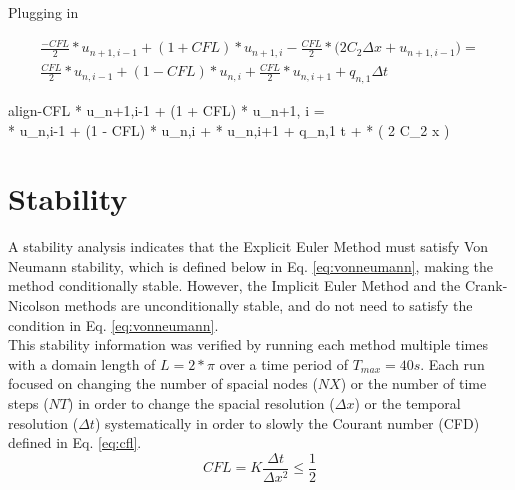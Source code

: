 \documentclass[10pt, letter, showtrims]{extarticle}
\newcommand{\boxedeq}[2]{\begin{empheq}[box={\fboxsep=6pt\fbox}]{align}\label{#1}#2\end{empheq}}
\begin{document}
    		\noindent
    		Plugging in
    		
    		\begin{equation}
    			\begin{split}
    			\frac{-CFL}{2} * u_{n+1,i-1} + (1 + CFL) * u_{n+1, i} - \frac{CFL}{2} * \big( 2 C_{2} \Delta x + u_{n+1,i-1} \big) = \\ 
    			\frac{CFL}{2} * u_{n,i-1} + (1 - CFL) * u_{n,i} + \frac{CFL}{2} * u_{n,i+1} + q_{n,1} \Delta t
    			\end{split}
    		\end{equation}
    		
    		\boxedeq{}{-CFL * u_{n+1,i-1} + (1 + CFL) * u_{n+1, i} = \\ 
    			\frac{CFL}{2} * u_{n,i-1} + (1 - CFL) * u_{n,i} + \frac{CFL}{2} * u_{n,i+1} + q_{n,1} \Delta t + \frac{CFL}{2} * \big( 2 C_{2} \Delta x \big)}
    		
		\pagebreak
		
		\section{Stability}
		
		\noindent
		A stability analysis indicates that the Explicit Euler Method must satisfy Von Neumann stability, which is defined below in Eq. \ref{eq:vonneumann}, making the method conditionally stable. However, the Implicit Euler Method and the Crank-Nicolson methods are unconditionally stable, and do not need to satisfy the condition in Eq. \ref{eq:vonneumann}. \\
		
		\noindent
		This stability information was verified by running each method multiple times with a domain length of $L = 2*\pi$ over a time period of $T_{max} = 40 s$. Each run focused on changing the number of spacial nodes ($NX$) or the number of time steps ($NT$) in order to change the spacial resolution ($\Delta x$) or the temporal resolution ($\Delta t$) systematically in order to slowly the Courant number (CFD) defined in Eq. \ref{eq:cfl}.	\\
		

		
		\begin{equation}
		\label{eq:vonneumann}
			CFL = K\frac{\Delta t}{\Delta x^{2}} \leq \frac{1}{2}
		\end{equation}	
\end{document}
